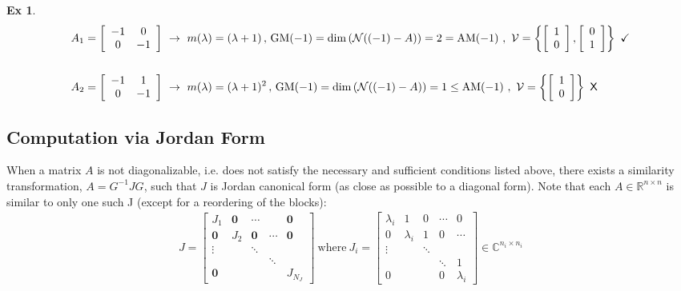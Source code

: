 \documentclass[twoside]{article}
\newtheorem{exmp}[theorem]{Ex}
\begin{document}
\begin{exmp}
\begin{align*}
A_1 &=   \left[ \begin{array}{cc} -1 & 0  \\ 0 & -1 \end{array} \right] \ \rightarrow  \ m(\lambda) = (\lambda + 1) \, , \, 
\mathrm{GM}(-1) = \mathrm{dim}\left( \mathcal{N}((-1) - A) \right) = 2 = \mathrm{AM}(-1) \ , \  \mathcal{V} = \left\lbrace  \left[ \begin{array}{c} 1 \\ 0  \end{array} \right] ,   \left[ \begin{array}{c} 0  \\ 1  \end{array} \right]  \right\rbrace \ \checkmark
\\
\\
A_2 &=   \left[ \begin{array}{cc} -1 & 1  \\ 0 & -1 \end{array} \right] \ \rightarrow \ m(\lambda) = (\lambda + 1)^2 \, , \, 
\mathrm{GM}(-1) = \mathrm{dim}\left( \mathcal{N}((-1) - A) \right) = 1 \leq \mathrm{AM}(-1) \ , \  \mathcal{V} = \left\lbrace  \left[ \begin{array}{c} 1 \\ 0  \end{array} \right]  \right\rbrace \ \text{\sffamily X}
\end{align*}
\end{exmp}

\subsection{Computation via Jordan Form}

When a matrix $A$ is not diagonalizable, i.e. does not satisfy the necessary and sufficient conditions listed above, there exists a similarity transformation, $A = G^{-1} J G$, such that $J$  
is Jordan canonical form (as close as possible to a diagonal form). Note that each $A \in \mathbb{R}^{n \times n}$ is similar to only one such J (except for a reordering of the blocks):
%
\begin{align*}
J = \left[  \begin{array}{ccccc} J_1 & \mathbf{0} & \cdots & & \mathbf{0} \\ \mathbf{0} & J_2 & \mathbf{0} & \cdots & \mathbf{0} \\ \vdots &  & \ddots &  \\ & & & \ddots &  \\
\mathbf{0} &  &  &  & J_{N_J} \end{array} \right] \ \mathrm{where} \ 
J_i = \left[  \begin{array}{ccccc} \lambda_i & 1 & 0 & \cdots & 0  \\ 0 & \lambda_i & 1 & 0 & \cdots  \\ 
\vdots &  & \ddots &  \\ & & & \ddots & 1 \\
0 &  &  & 0 & \lambda_i \end{array} \right]  \in \mathbb{C}^{n_i \times n_i}
\end{align*}
\end{document}
